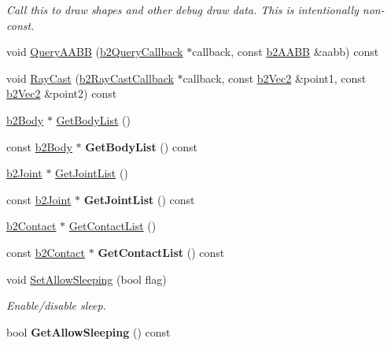 \begin{DoxyCompactItemize}
\begin{DoxyCompactList}\small\item\em Call this to draw shapes and other debug draw data. This is intentionally non-\/const. \end{DoxyCompactList}\item 
void \hyperlink{classb2_world_a711e55d2c6e68400f93472f807c3775b}{Query\+A\+A\+BB} (\hyperlink{classb2_query_callback}{b2\+Query\+Callback} $\ast$callback, const \hyperlink{structb2_a_a_b_b}{b2\+A\+A\+BB} \&aabb) const 
\item 
void \hyperlink{classb2_world_ad902548be84df9cc36eced0f4c89ab0a}{Ray\+Cast} (\hyperlink{classb2_ray_cast_callback}{b2\+Ray\+Cast\+Callback} $\ast$callback, const \hyperlink{structb2_vec2}{b2\+Vec2} \&point1, const \hyperlink{structb2_vec2}{b2\+Vec2} \&point2) const 
\item 
\hyperlink{classb2_body}{b2\+Body} $\ast$ \hyperlink{classb2_world_a1b87c03955e3312d308ddf679adf3c85}{Get\+Body\+List} ()
\item 
const \hyperlink{classb2_body}{b2\+Body} $\ast$ {\bfseries Get\+Body\+List} () const \hypertarget{classb2_world_ab7c43e574c60203db003645153663266}{}\label{classb2_world_ab7c43e574c60203db003645153663266}

\item 
\hyperlink{classb2_joint}{b2\+Joint} $\ast$ \hyperlink{classb2_world_a55db7240f8290aa02cab79f181934de8}{Get\+Joint\+List} ()
\item 
const \hyperlink{classb2_joint}{b2\+Joint} $\ast$ {\bfseries Get\+Joint\+List} () const \hypertarget{classb2_world_a966ceb42d968a8a544d60826ce0ed925}{}\label{classb2_world_a966ceb42d968a8a544d60826ce0ed925}

\item 
\hyperlink{classb2_contact}{b2\+Contact} $\ast$ \hyperlink{classb2_world_ab1e1c59fd7534c0268c2a3e31370a425}{Get\+Contact\+List} ()
\item 
const \hyperlink{classb2_contact}{b2\+Contact} $\ast$ {\bfseries Get\+Contact\+List} () const \hypertarget{classb2_world_a15e9281350c0494954197801372e3dbb}{}\label{classb2_world_a15e9281350c0494954197801372e3dbb}

\item 
void \hyperlink{classb2_world_a6755872564fc3db70c69d2b9d349fa33}{Set\+Allow\+Sleeping} (bool flag)\hypertarget{classb2_world_a6755872564fc3db70c69d2b9d349fa33}{}\label{classb2_world_a6755872564fc3db70c69d2b9d349fa33}

\begin{DoxyCompactList}\small\item\em Enable/disable sleep. \end{DoxyCompactList}\item 
bool {\bfseries Get\+Allow\+Sleeping} () const \hypertarget{classb2_world_aaf98b836840452d646927ba19a02316f}{}\label{classb2_world_aaf98b836840452d646927ba19a02316f}


\end{DoxyCompactItemize}
